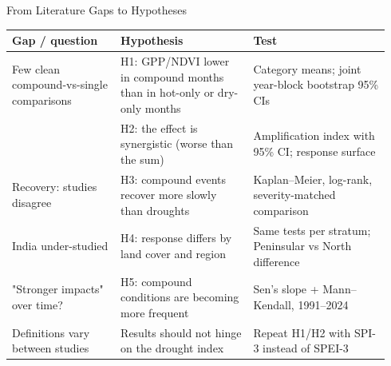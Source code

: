 \documentclass[12pt,aspectratio=169]{beamer}
\begin{document}
\begin{frame}{From Literature Gaps to Hypotheses}
  \scriptsize
  \renewcommand{\arraystretch}{0.95}
  \begin{tabular}{@{}p{0.27\linewidth}p{0.33\linewidth}p{0.34\linewidth}@{}}
    \toprule
    \textbf{Gap / question} & \textbf{Hypothesis} & \textbf{Test} \\
    \midrule
    Few clean compound-vs-single comparisons &
      H1: GPP/NDVI lower in compound months than in hot-only or dry-only months &
      Category means; joint year-block bootstrap 95\% CIs \\
    &
      H2: the effect is synergistic (worse than the sum) &
      Amplification index with 95\% CI; response surface \\
    Recovery: studies disagree \citep{yao2024,huang2025,feng2026} &
      H3: compound events recover more slowly than droughts &
      Kaplan--Meier, log-rank, severity-matched comparison \\
    India under-studied &
      H4: response differs by land cover and region &
      Same tests per stratum; Peninsular vs North difference \\
    "Stronger impacts" over time? &
      H5: compound conditions are becoming more frequent &
      Sen's slope + Mann--Kendall, 1991--2024 \\
    Definitions vary between studies &
      Results should not hinge on the drought index &
      Repeat H1/H2 with SPI-3 instead of SPEI-3 \\
    \bottomrule
  \end{tabular}
\end{frame}
\end{document}
